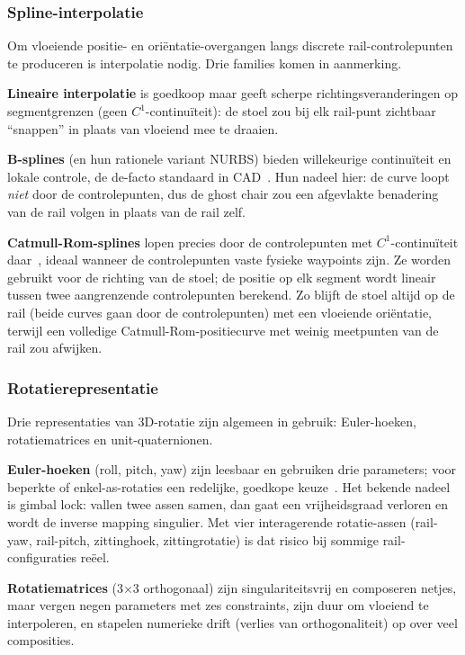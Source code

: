 \documentclass[10pt, a4paper, twocolumn]{article}
\begin{document}
\subsubsection{Spline-interpolatie}
Om vloeiende positie- en oriëntatie-overgangen langs discrete rail-controlepunten
te produceren is interpolatie nodig. Drie families komen in aanmerking.

\textbf{Lineaire interpolatie} is goedkoop maar geeft scherpe
richtingsveranderingen op segmentgrenzen (geen $C^1$-continuïteit): de stoel zou
bij elk rail-punt zichtbaar ``snappen'' in plaats van vloeiend mee te draaien.

\textbf{B-splines} (en hun rationele variant NURBS) bieden willekeurige
continuïteit en lokale controle, de de-facto standaard in CAD~\cite{piegl1991nurbs}.
Hun nadeel hier: de curve loopt \emph{niet} door de controlepunten, dus de ghost
chair zou een afgevlakte benadering van de rail volgen in plaats van de rail zelf.

\textbf{Catmull-Rom-splines} lopen precies door de controlepunten met
$C^1$-continuïteit daar~\cite{catmullrom1974}, ideaal wanneer de controlepunten
vaste fysieke waypoints zijn. Ze worden gebruikt voor de richting van de stoel; de
positie op elk segment wordt lineair tussen twee aangrenzende controlepunten
berekend. Zo blijft de stoel altijd op de rail (beide curves gaan door de
controlepunten) met een vloeiende oriëntatie, terwijl een volledige
Catmull-Rom-positiecurve met weinig meetpunten van de rail zou afwijken.

\subsubsection{Rotatierepresentatie}
Drie representaties van 3D-rotatie zijn algemeen in gebruik: Euler-hoeken,
rotatiematrices en unit-quaternionen.

\textbf{Euler-hoeken} (roll, pitch, yaw) zijn leesbaar en gebruiken drie
parameters; voor beperkte of enkel-as-rotaties een redelijke, goedkope
keuze~\cite{diebel2006attitude}. Het bekende nadeel is gimbal lock: vallen twee
assen samen, dan gaat een vrijheidsgraad verloren en wordt de inverse mapping
singulier. Met vier interagerende rotatie-assen (rail-yaw, rail-pitch,
zittinghoek, zittingrotatie) is dat risico bij sommige rail-configuraties reëel.

\textbf{Rotatiematrices} (3$\times$3 orthogonaal) zijn singulariteitsvrij en
composeren netjes, maar vergen negen parameters met zes constraints, zijn duur om
vloeiend te interpoleren, en stapelen numerieke drift (verlies van
orthogonaliteit) op over veel composities.
\end{document}
